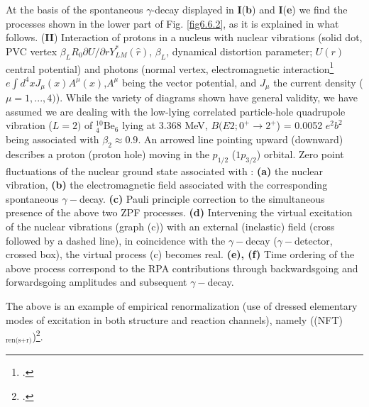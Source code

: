   	
  	At the basis of the spontaneous $\gamma$-decay displayed in \textbf{I}(\textbf{b}) and \textbf{I}(\textbf{e}) we find the processes shown in the lower part of Fig. \ref{fig6.6.2}, as it is explained in what follows. (\textbf{II}) Interaction of protons in a nucleus with nuclear vibrations (solid dot, PVC vertex 
  	$\beta_L R_0  \partial U/\partial r Y_{LM}^*(\hat r)$, $\beta_L$, dynamical
  	distortion parameter; $U(r)$ central potential) and photons (normal vertex, 
  	electromagnetic 
  	interaction\footnote{\cite{Holstein:89}.} $e \int d^4 x J_{\mu}(x) A^{\mu} (x)$,$A^{\mu}$ being 
  	the vector potential, and $J_{\mu}$ the current density ($\mu=1,...,4)$).
  	While the variety of diagrams shown have general validity, we have assumed
  	we are dealing with the low-lying correlated particle-hole quadrupole vibration 
  	($L=2)$ of $^{10}_4$Be$_6$ lying at 3.368 MeV,  $B(E2; 0^+ \to 2^+$) = 0.0052 $e^2 b^2$ being
  	associated with $\beta_2 \approx 0.9$. An arrowed line pointing  upward (downward) 
  	describes a proton (proton hole) moving in the $p_{1/2}$ ($1p_{3/2}$) orbital. 
  	Zero point fluctuations of the nuclear ground state associated with : {\bf (a)} the nuclear
  	vibration, {\bf (b)} the electromagnetic field associated with the corresponding spontaneous
  	$\gamma-$decay.   {\bf (c)} Pauli principle correction to the simultaneous presence 
  	of the above two ZPF processes. {\bf (d)} Intervening the virtual excitation of the nuclear vibrations 
  	(graph (c)) with an external (inelastic) field  (cross followed by a dashed line), in coincidence with the $\gamma-$decay 
  	($\gamma-$detector, crossed box), the virtual process (c) becomes real. {\bf (e), (f)}  Time ordering of the 
  	above process correspond to the  RPA contributions through backwardsgoing and forwardsgoing amplitudes
  	and subsequent $\gamma-$decay.
  	
  	
  	The above is an example of empirical renormalization (use of dressed elementary modes of excitation in both structure and  reaction channels), namely  ((NFT)$_{\text{ren(s+r)}}$)\footnote{\cite{Broglia:16}.}.
